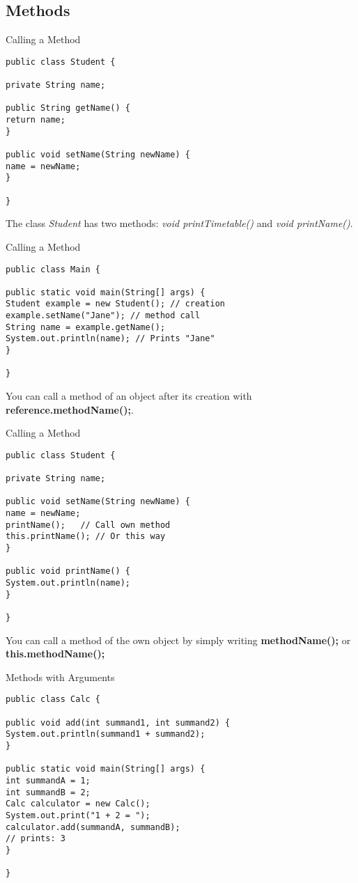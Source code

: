 \subsection{Methods}
\begin{frame}[fragile]{Calling a Method}
\begin{lstlisting}
public class Student {

private String name;

public String getName() {
return name;
}

public void setName(String newName) {
name = newName;
}

}
\end{lstlisting}
The class \emph{Student} has two methods: \emph{void printTimetable()} and \emph{void printName()}.
\end{frame}

\begin{frame}[fragile]{Calling a Method}
\begin{lstlisting}
public class Main {

public static void main(String[] args) {
Student example = new Student(); // creation
example.setName("Jane"); // method call
String name = example.getName(); 
System.out.println(name); // Prints "Jane"
}

}
\end{lstlisting}
You can call a method of an object after its creation with \textbf{reference.methodName();}.
\end{frame}

\begin{frame}[fragile]{Calling a Method}
\begin{lstlisting}
public class Student {

private String name;

public void setName(String newName) {
name = newName;
printName();   // Call own method
this.printName(); // Or this way
}

public void printName() {
System.out.println(name);
}

}
\end{lstlisting}
You can call a method of the own object by simply writing \textbf{methodName();} or \textbf{this.methodName();}
\end{frame}

\begin{frame}[fragile]{Methods with Arguments}

\begin{lstlisting}
public class Calc {

public void add(int summand1, int summand2) {
System.out.println(summand1 + summand2);
}

public static void main(String[] args) {
int summandA = 1;
int summandB = 2;
Calc calculator = new Calc();
System.out.print("1 + 2 = ");
calculator.add(summandA, summandB); 
// prints: 3
}

}
\end{lstlisting}
\end{frame}

